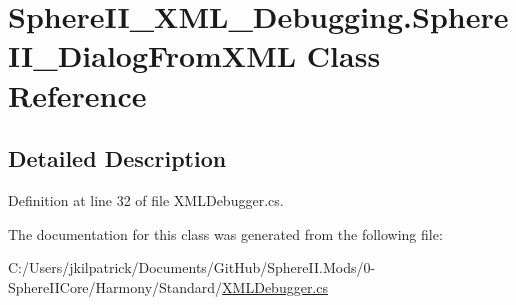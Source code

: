 \hypertarget{class_sphere_i_i___x_m_l___debugging_1_1_sphere_i_i___dialog_from_x_m_l}{}\section{Sphere\+I\+I\+\_\+\+X\+M\+L\+\_\+\+Debugging.\+Sphere\+I\+I\+\_\+\+Dialog\+From\+X\+ML Class Reference}
\label{class_sphere_i_i___x_m_l___debugging_1_1_sphere_i_i___dialog_from_x_m_l}


\subsection{Detailed Description}


Definition at line 32 of file X\+M\+L\+Debugger.\+cs.



The documentation for this class was generated from the following file\+:\begin{DoxyCompactItemize}
\item 
C\+:/\+Users/jkilpatrick/\+Documents/\+Git\+Hub/\+Sphere\+I\+I.\+Mods/0-\/\+Sphere\+I\+I\+Core/\+Harmony/\+Standard/\mbox{\hyperlink{_x_m_l_debugger_8cs}{X\+M\+L\+Debugger.\+cs}}\end{DoxyCompactItemize}
